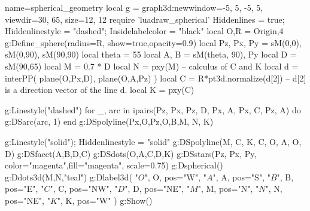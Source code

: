 \documentclass{standalone}
\begin{document}
    \begin{luadraw}{name=spherical_geometry}
    local g = graph3d:new{window={-5, 5, -5, 5}, viewdir={30, 65}, size={12, 12}}
    require 'luadraw_spherical'
    Hiddenlines = true; Hiddenlinestyle = "dashed"; Insidelabelcolor = "black"
    local O,R = Origin,4
    g:Define_sphere({radius=R, show=true,opacity=0.9})
    local Pz, Px, Py = sM(0,0), sM(0,90), sM(90,90)
    local theta = 55
    local A, B = sM(theta, 90), Py
    local D = sM(90,65)
    local M = 0.7 * D
    local N = pxy(M)
    -- calculus of C and  K
    local d = interPP( plane(O,Px,D), plane(O,A,Pz) )
    local C = R*pt3d.normalize(d[2]) -- d[2] is a direction vector of the line d.
    local K = pxy(C)
    
    g:Linestyle("dashed")
    for _, arc in ipairs({{Pz, Px}, {Pz, D}, {Px, A}, {Px, C}, {Pz, A}}) do
        g:DSarc(arc, 1)
    end
    g:DSpolyline({{Px,O,Pz},{O,B},{M, N, K}})
   
    g:Linestyle("solid"); Hiddenlinestyle = "solid"
    g:DSpolyline({{M, C, K}, {C, O, A}, {O, D}})
    g:DSfacet({A,B,D,C})
    g:DSdots({O,A,C,D,K}) 
    g:DSstars({Pz, Px, Py}, {color="magenta",fill="magenta", scale=0.75}) 
    g:Dspherical()
    g:Ddots3d({M,N},"teal") 
    g:Dlabel3d(
        "$O$", O, {pos="W"}, 
        "$A$", A, {pos="S"}, 
        "$B$", B, {pos="E"}, 
        "$C$", C, {pos="NW"}, 
        "$D$", D, {pos="NE"}, 
        "$M$", M, {pos="N"}, 
        "$N$", N, {pos="NE"},
        "$K$", K, {pos="W"}
    )
    g:Show()
    \end{luadraw}
\end{document}
